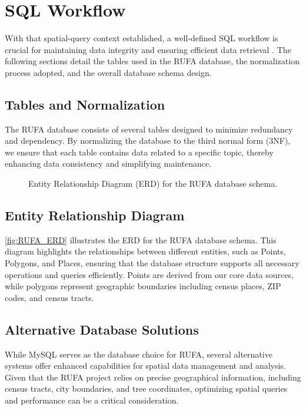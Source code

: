 \section{SQL Workflow}

With that spatial-query context established, a well-defined SQL workflow is crucial for maintaining data integrity and ensuring efficient data retrieval \cite{codd1970}. The following sections detail the tables used in the RUFA database, the normalization process adopted, and the overall database schema design.


\subsection{Tables and Normalization}

The RUFA database consists of several tables designed to minimize redundancy and dependency. By normalizing the database to the third normal form (3NF), we ensure that each table contains data related to a specific topic, thereby enhancing data consistency and simplifying maintenance.

\begin{figure}[h!]
    \centering
    \resizebox{\linewidth}{!}{}%
    \caption{Entity Relationship Diagram (ERD) for the RUFA database schema.}
    \label{fig:RUFA_ERD}
\end{figure}

\subsection{Entity Relationship Diagram}

\autoref{fig:RUFA_ERD} illustrates the ERD for the RUFA database schema. This diagram highlights the relationships between different entities, such as Points, Polygons, and Places, ensuring that the database structure supports all necessary operations and queries efficiently. Points are derived from our core data sources, while polygons represent geographic boundaries including census places, ZIP codes, and census tracts.


\subsection{Alternative Database Solutions}

While MySQL serves as the database choice for RUFA, several alternative systems offer enhanced capabilities for spatial data management and analysis. Given that the RUFA project relies on precise geographical information, including census tracts, city boundaries, and tree coordinates, optimizing spatial queries and performance can be a critical consideration.

